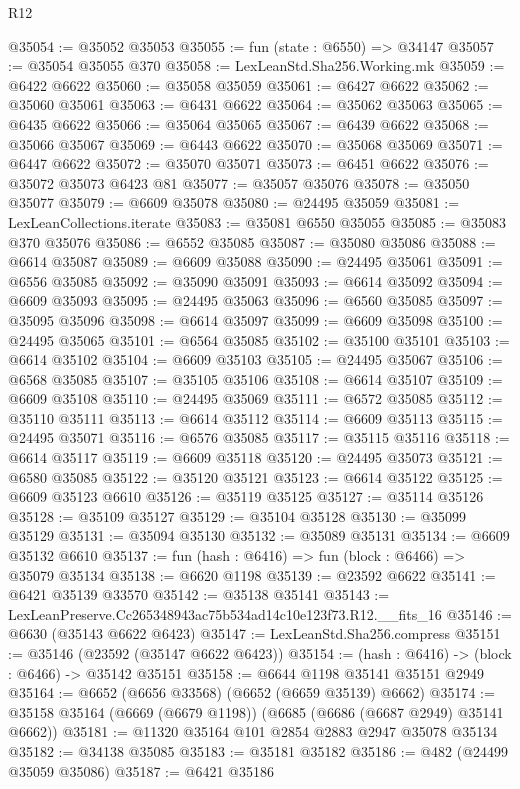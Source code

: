 \begin{lexlean}{R12}
\begin{coremodule}
@35054 := @35052 @35053
@35055 := fun (state : @6550) => @34147
@35057 := @35054 @35055 @370
@35058 := LexLeanStd.Sha256.Working.mk
@35059 := @6422 @6622
@35060 := @35058 @35059
@35061 := @6427 @6622
@35062 := @35060 @35061
@35063 := @6431 @6622
@35064 := @35062 @35063
@35065 := @6435 @6622
@35066 := @35064 @35065
@35067 := @6439 @6622
@35068 := @35066 @35067
@35069 := @6443 @6622
@35070 := @35068 @35069
@35071 := @6447 @6622
@35072 := @35070 @35071
@35073 := @6451 @6622
@35076 := @35072 @35073 @6423 @81
@35077 := @35057 @35076
@35078 := @35050 @35077
@35079 := @6609 @35078
@35080 := @24495 @35059
@35081 := LexLeanCollections.iterate
@35083 := @35081 @6550 @35055
@35085 := @35083 @370 @35076
@35086 := @6552 @35085
@35087 := @35080 @35086
@35088 := @6614 @35087
@35089 := @6609 @35088
@35090 := @24495 @35061
@35091 := @6556 @35085
@35092 := @35090 @35091
@35093 := @6614 @35092
@35094 := @6609 @35093
@35095 := @24495 @35063
@35096 := @6560 @35085
@35097 := @35095 @35096
@35098 := @6614 @35097
@35099 := @6609 @35098
@35100 := @24495 @35065
@35101 := @6564 @35085
@35102 := @35100 @35101
@35103 := @6614 @35102
@35104 := @6609 @35103
@35105 := @24495 @35067
@35106 := @6568 @35085
@35107 := @35105 @35106
@35108 := @6614 @35107
@35109 := @6609 @35108
@35110 := @24495 @35069
@35111 := @6572 @35085
@35112 := @35110 @35111
@35113 := @6614 @35112
@35114 := @6609 @35113
@35115 := @24495 @35071
@35116 := @6576 @35085
@35117 := @35115 @35116
@35118 := @6614 @35117
@35119 := @6609 @35118
@35120 := @24495 @35073
@35121 := @6580 @35085
@35122 := @35120 @35121
@35123 := @6614 @35122
@35125 := @6609 @35123 @6610
@35126 := @35119 @35125
@35127 := @35114 @35126
@35128 := @35109 @35127
@35129 := @35104 @35128
@35130 := @35099 @35129
@35131 := @35094 @35130
@35132 := @35089 @35131
@35134 := @6609 @35132 @6610
@35137 := fun (hash : @6416) => fun (block : @6466) => @35079 @35134
@35138 := @6620 @1198
@35139 := @23592 @6622
@35141 := @6421 @35139 @33570
@35142 := @35138 @35141
@35143 := LexLeanPreserve.Cc265348943ac75b534ad14c10e123f73.R12.__fits_16
@35146 := @6630 (@35143 @6622 @6423)
@35147 := LexLeanStd.Sha256.compress
@35151 := @35146 (@23592 (@35147 @6622 @6423))
@35154 := (hash : @6416) -> (block : @6466) -> @35142 @35151
@35158 := @6644 @1198 @35141 @35151 @2949
@35164 := @6652 (@6656 @33568) (@6652 (@6659 @35139) @6662)
@35174 := @35158 @35164 (@6669 (@6679 @1198)) (@6685 (@6686 (@6687 @2949) @35141 @6662))
@35181 := @11320 @35164 @101 @2854 @2883 @2947 @35078 @35134
@35182 := @34138 @35085
@35183 := @35181 @35182
@35186 := @482 (@24499 @35059 @35086)
@35187 := @6421 @35186

\end{coremodule}
\end{lexlean}

